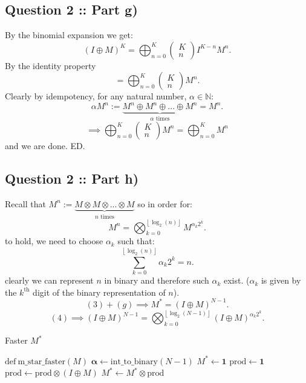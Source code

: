 \documentclass[a4paper]{article}
\begin{document}
\subsection*{Question 2 :: Part g)}
By the binomial expansion we get:
\[
    (I \oplus M)^K = \bigoplus_{n=0}^{K} \begin{pmatrix}K\\n\end{pmatrix} I^{K-n} M^n
.\]
By the identity property
\[
= \bigoplus_{n=0}^K \begin{pmatrix}K\\n\end{pmatrix} M^n
.\]
Clearly by idempotency, for any natural number, $\alpha \in \mathbb{N}$:
\[
    \alpha M^n :=  \underbrace{M^n \oplus M^n \oplus ... \oplus M^n}_{\alpha\text{ times}} = M^n
.\]
\[
\implies \bigoplus_{n=0}^K  \begin{pmatrix}K\\n\end{pmatrix} M^n = \bigoplus_{n=0}^K M^n
\]
and we are done. ED.


\subsection*{Question 2 :: Part h)}
Recall that $M^n := \underbrace{M \otimes M \otimes ... \otimes M}_{n\text{ times}}$
so in order for:
\[
    M^n = \bigotimes_{k=0}^{\left\lfloor \log_2(n) \right\rfloor} M^{\alpha_k 2^k}
.\]
to hold, we need to choose $\alpha_k$ such that:
\[
\sum_{k=0}^{\left\lfloor \log_2(n) \right\rfloor} \alpha_k 2^k = n
.\]
clearly we can represent $n$ in binary and therefore such $\alpha_k$ exist.
($\alpha_k$ is given by the $k^{\text{th}}$ digit of the binary representation of $n$).
\[
    (3) + (g) \implies M^* = (I \oplus M)^{N-1}
.\]
\[
    (4) \implies (I \oplus M)^{N-1} = \bigotimes_{k=0}^{\left\lfloor \log_2(N-1) \right\rfloor} (I \oplus M)^{\alpha_k 2^k}
.\]

\begin{algorithm}
\caption{Faster $M^*$}
\begin{algorithmic}
    \State  $\mathrm{def~m\_star\_faster} (M)$
        \State $\bm{\alpha} \gets \text{int\_to\_binary}(N-1)$
        \State $M^* \gets \bm{1}$
        \State $\text{prod} \gets \bm{1}$
                \State $\text{prod} \gets \text{prod} \otimes (I \oplus M)$
                \State $M^* \gets M^* \otimes \text{prod}$
            \EndIf
        \EndFor


\end{algorithmic}
\end{algorithm}
\end{document}
